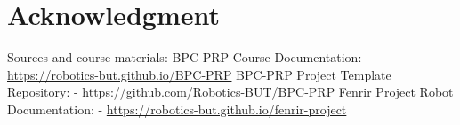 \documentclass[conference]{IEEEtran}
\begin{document}
\section*{Acknowledgment}
Sources and course materials: \newline
[1] BPC-PRP Course Documentation: \newline
-  \url{https://robotics-but.github.io/BPC-PRP} \newline
[2] BPC-PRP Project Template Repository: \newline
-  \url{https://github.com/Robotics-BUT/BPC-PRP} \newline
[3] Fenrir Project Robot Documentation: \newline
-  \url{https://robotics-but.github.io/fenrir-project}

\printbibliography
\end{document}

